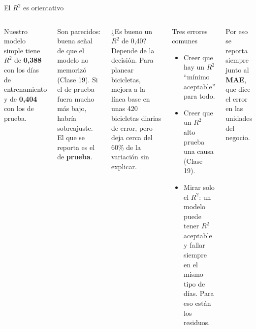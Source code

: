 \documentclass[aspectratio=169,11pt]{beamer}
\begin{document}
\begin{frame}[t]{El $R^2$ es orientativo}
  \begin{columns}[T,onlytextwidth]
    \small
    Nuestro modelo simple tiene $R^2$ de \textbf{0,388} con los días de
    entrenamiento y de \textbf{0,404} con los de prueba.
    \vspace{0.1cm}

    \footnotesize Son parecidos: buena señal de que el modelo no memorizó
    (Clase 19). Si el de prueba fuera mucho más bajo, habría sobreajuste. El
    que se reporta es el de \textbf{prueba}.
    \vspace{0.15cm}
    \begin{block}{¿Es bueno un $R^2$ de 0,40?}
      \footnotesize Depende de la decisión. Para planear bicicletas, mejora
      a la línea base en unas 420 bicicletas diarias de error, pero deja
      cerca del 60\% de la variación sin explicar.
    \end{block}
    \begin{alertblock}{Tres errores comunes}
      \footnotesize
      \begin{itemize}
        \footnotesize
        \item Creer que hay un $R^2$ ``mínimo aceptable'' para todo.
        \item Creer que un $R^2$ alto prueba una causa (Clase 19).
        \item Mirar solo el $R^2$: un modelo puede tener $R^2$ aceptable y
          fallar siempre en el mismo tipo de días. Para eso están los
          residuos.
      \end{itemize}
    \end{alertblock}
    \footnotesize Por eso se reporta siempre junto al \textbf{MAE}, que dice
    el error en las unidades del negocio.
  \end{columns}
\end{frame}
\end{document}
